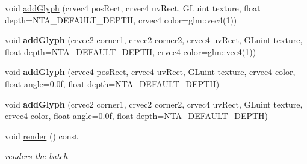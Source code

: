 \begin{DoxyCompactItemize}
void \hyperlink{classnta_1_1SpriteBatch_aa703fb92d0bd42865c21fdfb2625660d}{add\+Glyph} (crvec4 pos\+Rect, crvec4 uv\+Rect, G\+Luint texture, float depth=N\+T\+A\+\_\+\+D\+E\+F\+A\+U\+L\+T\+\_\+\+D\+E\+P\+TH, crvec4 color=glm\+::vec4(1))
\item 
\mbox{\label{classnta_1_1SpriteBatch_a4a6041951ba065a9ad0e7265bef531ef}} 
void {\bfseries add\+Glyph} (crvec2 corner1, crvec2 corner2, crvec4 uv\+Rect, G\+Luint texture, float depth=N\+T\+A\+\_\+\+D\+E\+F\+A\+U\+L\+T\+\_\+\+D\+E\+P\+TH, crvec4 color=glm\+::vec4(1))
\item 
\mbox{\label{classnta_1_1SpriteBatch_aa1140b7406415ac23916c621850752da}} 
void {\bfseries add\+Glyph} (crvec4 pos\+Rect, crvec4 uv\+Rect, G\+Luint texture, crvec4 color, float angle=0.\+0f, float depth=\+N\+T\+A\+\_\+\+D\+E\+F\+A\+U\+L\+T\+\_\+\+D\+E\+P\+T\+H)
\item 
\mbox{\label{classnta_1_1SpriteBatch_abc646a12cc113c84f7ca005e810d1d67}} 
void {\bfseries add\+Glyph} (crvec2 corner1, crvec2 corner2, crvec4 uv\+Rect, G\+Luint texture, crvec4 color, float angle=0.\+0f, float depth=\+N\+T\+A\+\_\+\+D\+E\+F\+A\+U\+L\+T\+\_\+\+D\+E\+P\+T\+H)
\item 
\mbox{\label{classnta_1_1SpriteBatch_ae7566d38b0cdd33f2b3e16dfcf993714}} 
void \hyperlink{classnta_1_1SpriteBatch_ae7566d38b0cdd33f2b3e16dfcf993714}{render} () const
\begin{DoxyCompactList}\small\item\em renders the batch \end{DoxyCompactList}\end{DoxyCompactItemize}
